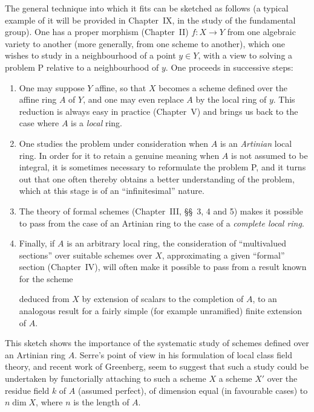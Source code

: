 The general technique into which it fits can be sketched as follows (a typical example of it will be provided in Chapter~IX, in the study of the fundamental group).
One has a proper morphism (Chapter~II) $f:X\to Y$ from one algebraic variety to another (more generally, from one scheme to another), which one wishes to study in a neighbourhood of a point $y\in Y$, with a view to solving a problem P relative to a neighbourhood of $y$.
One proceeds in successive steps:
\begin{enumerate}
  \item[$1^\circ$] One may suppose $Y$ affine, so that $X$ becomes a scheme defined over the affine ring $A$ of $Y$, and one may even replace $A$ by the local ring of $y$.
  This reduction is always easy in practice (Chapter~V) and brings us back to the case where $A$ is a \emph{local} ring.
  \item[$2^\circ$] One studies the problem under consideration when $A$ is an \emph{Artinian} local ring.
  In order for it to retain a genuine meaning when $A$ is not assumed to be integral, it is sometimes necessary to reformulate the problem P, and it turns out that one often thereby obtains a better understanding of the problem, which at this stage is of an ``infinitesimal'' nature.
  \item[$3^\circ$] The theory of formal schemes (Chapter~III, \S\S~3, 4 and 5) makes it possible to pass from the case of an Artinian ring to the case of a \emph{complete local ring}.
  \item[$4^\circ$] Finally, if $A$ is an arbitrary local ring, the consideration of ``multivalued sections'' over suitable schemes over $X$, approximating a given ``formal'' section (Chapter~IV), will often make it possible to pass from a result known for the scheme

  deduced from $X$ by extension of scalars to the completion of $A$, to an analogous result for a fairly simple (for example unramified) finite extension of $A$.
\end{enumerate}

This sketch shows the importance of the systematic study of schemes defined over an Artinian ring $A$.
Serre's point of view in his formulation of local class field theory, and recent work of Greenberg, seem to suggest that such a study could be undertaken by functorially attaching to such a scheme $X$ a scheme $X'$ over the residue field $k$ of $A$ (assumed perfect), of dimension equal (in favourable cases) to $n\dim X$, where $n$ is the length of $A$.

